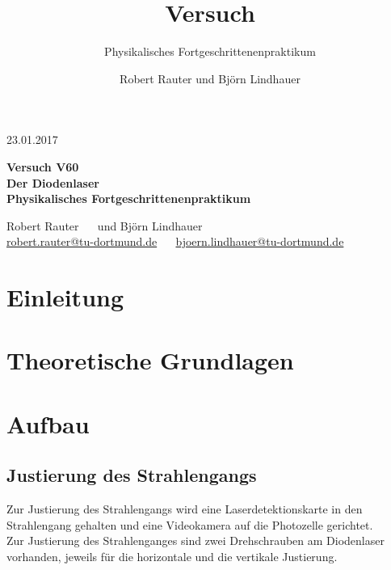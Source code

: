 \documentclass[captions=tableheading]{scrartcl}
\title{Versuch \versuchnummer\\ \versuchname}
\subtitle{Physikalisches Fortgeschrittenenpraktikum}
\author{Robert Rauter und Björn Lindhauer}
\date{\versuchdatum}
\newcommand{\versuchnummer}{V60}
\newcommand{\versuchname}{Der Diodenlaser}
\newcommand{\versuchdatum}{23.01.2017}
\begin{document}
\begin{titlepage}
{\large \versuchdatum}
\vspace{7cm}
\begin{center}
\textbf{\huge Versuch \versuchnummer}\\\vspace{0.5cm}
\textbf{\huge \versuchname}\\
\vspace{0.2cm}
\textbf{Physikalisches Fortgeschrittenenpraktikum}\\
\vspace{9cm}

{\Large Robert Rauter \ \ \hspace{1.5cm} und \hspace{1.5cm} Björn Lindhauer}\\
{ \url{robert.rauter@tu-dortmund.de} \ \ \hspace{2cm} \url{bjoern.lindhauer@tu-dortmund.de}}
\end{center}
\end{titlepage}
\section{Einleitung}

\section{Theoretische Grundlagen}

\section{Aufbau}

\subsection{Justierung des Strahlengangs}
Zur Justierung des Strahlengangs wird eine Laserdetektionskarte in den Strahlengang gehalten und eine Videokamera auf die Photozelle gerichtet. \\
Zur Justierung des Strahlenganges sind zwei Drehschrauben am Diodenlaser vorhanden, jeweils für die horizontale und die vertikale Justierung.
 
\end{document}
